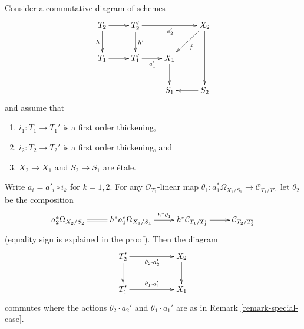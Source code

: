\begin{lemma}
\label{lemma-action-by-derivations-etale-localization}
Consider a commutative diagram of schemes
$$
\xymatrix{
T_2 \ar[r] \ar[d]_h & T_2' \ar[rr]_{a_2'} \ar[d]^{h'} & &
X_2 \ar[dd] \ar[ld]^f \\
T_1 \ar[r] & T_1' \ar[r]_{a_1'} & X_1 \ar[d] & \\
& & S_1 & S_2 \ar[l]
}
$$
and assume that
\begin{enumerate}
\item $i_1 : T_1 \to T_1'$ is a first order thickening,
\item $i_2 : T_2 \to T_2'$ is a first order thickening, and
\item $X_2 \to X_1$ and $S_2 \to S_1$ are \'etale.
\end{enumerate}
Write $a_i = a'_i \circ i_k$ for $k = 1, 2$.
For any $\mathcal{O}_{T_1}$-linear map
$\theta_1 : a_1^*\Omega_{X_1/S_1} \to \mathcal{C}_{T_1/T'_1}$ let
$\theta_2$ be the composition
$$
\xymatrix{
a_2^*\Omega_{X_2/S_2} \ar@{=}[r] &
h^*a_1^*\Omega_{X_1/S_1} \ar[r]^-{h^*\theta_1} &
h^*\mathcal{C}_{T_1/T'_1} \ar[r] &
\mathcal{C}_{T_2/T'_2}
}
$$
(equality sign is explained in the proof). Then the diagram
$$
\xymatrix{
T_2' \ar[rr]_{\theta_2 \cdot a_2'} \ar[d] & & X_2 \ar[d] \\
T_1' \ar[rr]^{\theta_1 \cdot a_1'} & & X_1
}
$$
commutes where the actions $\theta_2 \cdot a_2'$ and $\theta_1 \cdot a_1'$
are as in
Remark \ref{remark-special-case}.
\end{lemma}

